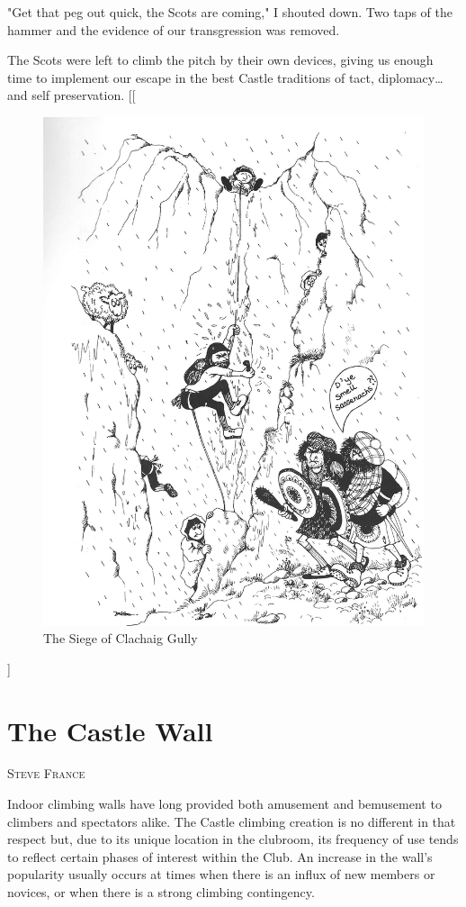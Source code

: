 \documentclass[a5paper,openany,font 10pt]{scrbook}
\makeatletter
\newcommand{\chapterauthor}[1]{%
{\parindent0pt\vspace*{-5pt}%
\linespread{1.1}\large\scshape#1%
\par\nobreak\vspace*{35pt}}
\@afterheading%
}
\makeatother
\begin{document}
"Get that peg out quick, the Scots are coming," I shouted
down. Two taps of the hammer and the evidence of our
transgression was removed.

The Scots were left to climb the pitch by their own devices,
giving us enough time to implement our escape in the best Castle
traditions of tact, diplomacy\ldots{} and self preservation.
[[\begin{figure}[htb]
\centering
\includegraphics[width=.9\linewidth]{./images/Cartoon_02.jpg}
\caption{\label{fig:org9eea6cc}
The Siege of Clachaig Gully}
\end{figure}]

\chapter{The Castle Wall}
\label{sec:orge68a776}
\chapterauthor{Steve France}

Indoor climbing walls have long provided both amusement and bemusement
to climbers and spectators alike. The Castle climbing creation is no
different in that respect but, due to its unique location in the
clubroom, its frequency of use tends to reflect certain phases of
interest within the Club. An increase in the wall's popularity usually
occurs at times when there is an influx of new members or novices, or
when there is a strong climbing contingency.
\end{document}
